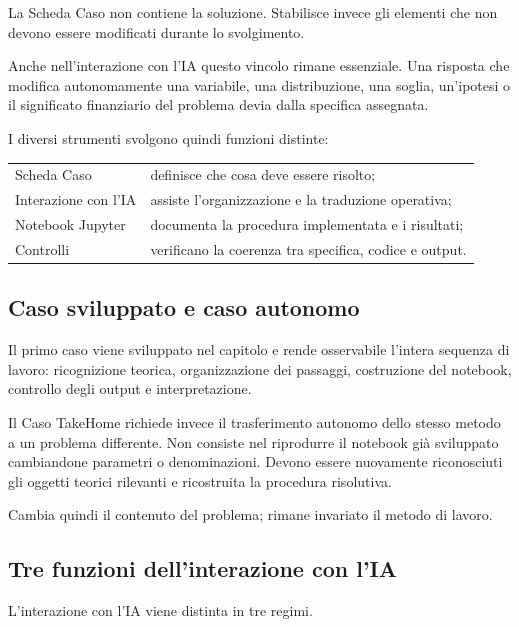 La Scheda Caso non contiene la soluzione. Stabilisce invece gli elementi che
non devono essere modificati durante lo svolgimento.

Anche nell'interazione con l'IA questo vincolo rimane essenziale. Una risposta
che modifica autonomamente una variabile, una distribuzione, una soglia,
un'ipotesi o il significato finanziario del problema devia dalla specifica
assegnata.

I diversi strumenti svolgono quindi funzioni distinte:

\begin{center}
\begin{tabular}{p{4.0cm}p{7.4cm}}
Scheda Caso & definisce che cosa deve essere risolto; \\
Interazione con l'IA & assiste l'organizzazione e la traduzione operativa; \\
Notebook Jupyter & documenta la procedura implementata e i risultati; \\
Controlli & verificano la coerenza tra specifica, codice e output.
\end{tabular}
\end{center}

\subsection{Caso sviluppato e caso autonomo}

Il primo caso viene sviluppato nel capitolo e rende osservabile l'intera
sequenza di lavoro: ricognizione teorica, organizzazione dei passaggi,
costruzione del notebook, controllo degli output e interpretazione.

Il Caso TakeHome richiede invece il trasferimento autonomo dello stesso metodo
a un problema differente. Non consiste nel riprodurre il notebook gi\`{a}
sviluppato cambiandone parametri o denominazioni. Devono essere nuovamente
riconosciuti gli oggetti teorici rilevanti e ricostruita la procedura
risolutiva.

Cambia quindi il contenuto del problema; rimane invariato il metodo di lavoro.

\subsection{Tre funzioni dell'interazione con l'IA}

L'interazione con l'IA viene distinta in tre regimi.

